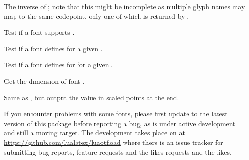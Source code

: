             The inverse of ; note that this
            might be incomplete as multiple glyph names may map to the
            same codepoint, only one of which is returned by
            .

            Test if a font supports .

            Test if a font defines  for a given
            .

            Test if a font defines  for
             for a given .

            Get the dimension  of font .

            Same as , but output the value
            in scaled points at the \TEX end.

\endfunctionlist

\endsubsubsection

% 
% 
% 

\endsubsection
\endsection



If you encounter problems with some fonts, please first update to the
latest version of this package before reporting a bug, as
 is under active development and still a moving
target.
%
The development takes place on  at
\url{https://github.com/lualatex/luaotfload} where there is an issue
tracker for submitting bug reports, feature requests and the likes
requests and the likes.

